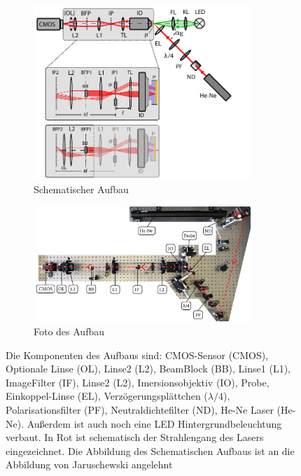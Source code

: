 \documentclass{article}
\begin{document}
	\begin{figure}
		\centering
		\begin{subfigure}[b]{0.9\textwidth}		
			\centering
			\includegraphics[width=0.9\textwidth]{figures/Aufbau_Schema.pdf}
			\caption{Schematischer Aufbau}			
			\label{fig:aufbau_schema}
		\end{subfigure}
		\vfil
		\begin{subfigure}[b]{0.9\textwidth} 
			\centering
			\includegraphics[width=0.9\textwidth]{figures/aufsicht_aufbau_anotated.jpg}
			\caption{Foto des Aufbau}
			\label{fig:aufsicht_aufbau_anotated}
		\end{subfigure}
		\caption{Die Komponenten des Aufbaus sind: CMOS-Sensor (CMOS), Optionale Linse (OL), Linse2 (L2), BeamBlock (BB), Linse1 (L1), ImageFilter (IF), Linse2 (L2), Imersionsobjektiv (IO), Probe, Einkoppel-Linse (EL), Verzögerungsplättchen ($\lambda/4$), Polarisationsfilter (PF), Neutraldichtefilter (ND), He-Ne Laser (He-Ne). Außerdem ist auch noch eine LED Hintergrundbeleuchtung verbaut. In Rot ist schematisch der Strahlengang des Lasers eingezeichnet. Die Abbildung des Schematischen Aufbaus ist an die Abbildung von Jaruschewski \cite{Jaruschewski.2020} angelehnt}
		\label{fig:Aufbau}
	\end{figure}
\end{document}
